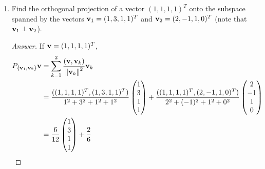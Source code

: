\documentclass[../psets.tex]{subfiles}
\begin{document}
\begin{enumerate}[label={\textbf{3.\arabic*.}}]
\begin{proof}[Answer]
\begin{align*}
\begin{pmatrix}
                -16 & -88 & 64\\
            \end{pmatrix}\\
            &= \frac{1}{54}
            \begin{pmatrix}
                5 & 14 & 7\\
                14 & 50 & -2\\
                7 & -2 & 53\\
            \end{pmatrix}
        \end{align*}
    \end{proof}
    \setcounter{enumi}{4}
    \item Find the orthogonal projection of a vector $(1,1,1,1)^T$ onto the subspace spanned by the vectors $\mathbf{v}_1=(1,3,1,1)^T$ and $\mathbf{v}_2=(2,-1,1,0)^T$ (note that $\mathbf{v}_1\perp\mathbf{v}_2$).
    \begin{proof}[Answer]
        If $\mathbf{v}=(1,1,1,1)^T$,
        \begingroup
        \allowdisplaybreaks
        \begin{align*}
            P_{\{\vm_1,\vm_2\}}\vm &= \sum_{k=1}^2\frac{(\vm,\vm_k)}{\norm{\vm_k}^2}\vm_k\\
            &= \frac{((1,1,1,1)^T,(1,3,1,1)^T)}{1^2+3^2+1^2+1^2}
            \begin{pmatrix}
                1\\
                3\\
                1\\
                1\\
            \end{pmatrix}
            +\frac{((1,1,1,1)^T,(2,-1,1,0)^T)}{2^2+(-1)^2+1^2+0^2}
            \begin{pmatrix}
                2\\
                -1\\
                1\\
                0\\
            \end{pmatrix}\\
            &= \frac{6}{12}
            \begin{pmatrix}
                1\\
                3\\
                1\\
                1\\
            \end{pmatrix}
            +\frac{2}{6}

\end{align*}
\end{proof}
\end{enumerate}
\end{document}
